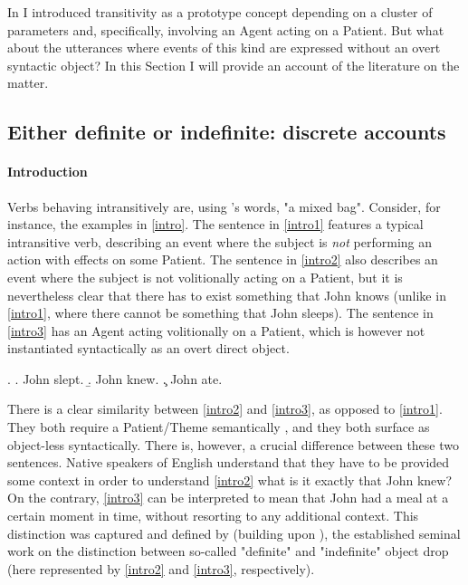 In  I introduced transitivity as a prototype concept depending on a cluster of parameters and, specifically, involving an Agent acting on a Patient. But what about the utterances where events of this kind are expressed without an overt syntactic object? In this Section I will provide an account of the literature on the matter.

\subsection{Either definite or indefinite: discrete accounts} 

\paragraph{Introduction}
Verbs behaving intransitively are, using \textcite[191]{rutherford1998workbook}'s words, "a mixed bag". Consider, for instance, the examples in \ref{intro}. The sentence in \ref{intro1} features a typical intransitive verb, describing an event where the subject is \textit{not} performing an action with effects on some Patient. The sentence in \ref{intro2} also describes an event where the subject is not volitionally acting on a Patient, but it is nevertheless clear that there has to exist something that John knows (unlike in \ref{intro1}, where there cannot be something that John sleeps). The sentence in \ref{intro3} has an Agent acting volitionally on a Patient, which is however not instantiated syntactically as an overt direct object.

\ex. \label{intro} \a. \label{intro1} John slept.
\b. \label{intro2} John knew.
\c. \label{intro3} John ate.

There is a clear similarity between \ref{intro2} and \ref{intro3}, as opposed to \ref{intro1}. They both require a Patient/Theme semantically \parencite[510]{Somers1984}, and they both surface as object-less syntactically. There is, however, a crucial difference between these two sentences. Native speakers of English understand that they have to be provided some context in order to understand \ref{intro2} \textemdash what is it exactly that John knew? On the contrary, \ref{intro3} can be interpreted to mean that John had a meal at a certain moment in time, without resorting to any additional context. This distinction was captured and defined by \textcite{Fillmore1986} (building upon \textcite{fillmore1969types, Allerton1975}), the established seminal work on the distinction between so-called "definite" and "indefinite" object drop (here represented by \ref{intro2} and \ref{intro3}, respectively).

